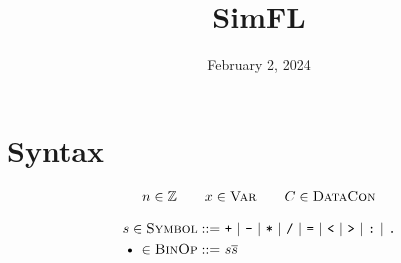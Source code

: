 \documentclass{article}
\title{SimFL}
\date{February 2, 2024}
\def\code#1{\textsf{#1}}
\def\por{\ | \ }
\def\binop{\, \text{\textbullet}\, }
\begin{document}
\maketitle
\section*{Syntax}

\begin{gather*}
n\in \mathbb{Z} \qquad x\in \textsc{Var} \qquad C \in \textsc{DataCon} 	
\end{gather*}

\begin{align*}
s\in \textsc{Symbol} ::= \ & \texttt{+} \por \texttt{-} \por \texttt{*} \por \texttt{/} \por \texttt{=} \por \texttt{<} \por \texttt{>} \por \texttt{:} \por \texttt{.} \\
\binop \in \textsc{BinOp} ::= \ & s\overline{s}
\end{align*}
\end{document}
